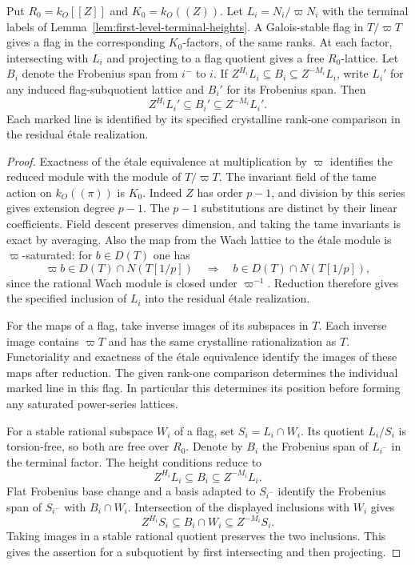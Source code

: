 \begin{lemma}
\label{lem:localized-induced-wach-heights}
Put \(R_0=k_O[[Z]]\) and \(K_0=k_O((Z))\). Let
\(L_i=N_i/\varpi N_i\) with the terminal labels of Lemma~\ref{lem:first-level-terminal-heights}. A Galois-stable flag in
\(T/\varpi T\) gives a flag in the corresponding \(K_0\)-factors,
of the same ranks. At each factor, intersecting with \(L_i\) and
projecting to a flag quotient gives a free \(R_0\)-lattice. Let \(B_i\) denote the Frobenius span from \(i^-\) to \(i\).
If \(Z^{H_i}L_i\subseteq B_i\subseteq Z^{-M_i}L_i\), write \(L_i'\) for any induced flag-subquotient lattice and \(B_i'\) for its Frobenius span. Then
\[
 Z^{H_i}L_i'\subseteq B_i'\subseteq Z^{-M_i}L_i'.
\] Each marked line is identified by its specified
crystalline rank-one comparison in the residual \'etale realization.
\end{lemma}

\begin{proof}
Exactness of the \'etale equivalence at multiplication by \(\varpi\)
identifies the reduced module with the module of \(T/\varpi T\).
The invariant field of the tame action on \(k_O((\pi))\) is \(K_0\).
Indeed \(Z\) has order \(p-1\), and division by this series gives
extension degree \(p-1\). The \(p-1\) substitutions are distinct by
their linear coefficients. Field descent preserves dimension, and
taking the tame invariants is exact by averaging. Also the map
from the Wach lattice to the \'etale module is \(\varpi\)-saturated:
for \(b\in D(T)\) one has
\[
 \varpi b\in D(T)\cap N(T[1/p])\quad\Longrightarrow\quad b\in D(T)\cap N(T[1/p]),
\]
since the rational Wach module is closed under \(\varpi^{-1}\). Reduction therefore gives the
specified inclusion of \(L_i\) into the residual \'etale realization.

For the maps of a flag, take inverse images of its subspaces in
\(T\). Each inverse image contains \(\varpi T\) and has the same
crystalline rationalization as \(T\). Functoriality and exactness
of the \'etale equivalence identify the images of these maps after
reduction. The given rank-one comparison determines the individual
marked line in this flag. In particular this determines its
position before forming any saturated power-series lattices.
\label{cor:cut-wach-models-2}

For a stable rational subspace \(W_i\) of a flag, set
\(S_i=L_i\cap W_i\). Its quotient \(L_i/S_i\) is torsion-free,
so both are free over \(R_0\). Denote by \(B_i\) the Frobenius
span of \(L_{i^-}\) in the terminal factor. The height conditions
reduce to
\[
    Z^{H_i} L_i\subseteq B_i\subseteq Z^{-M_i}L_i.
\]
Flat Frobenius base change and a basis adapted to \(S_{i^-}\)
identify the Frobenius span of \(S_{i^-}\) with \(B_i\cap W_i\).
Intersection of the displayed inclusions with \(W_i\) gives
\[
    Z^{H_i} S_i\subseteq B_i\cap W_i\subseteq Z^{-M_i}S_i.
\]
Taking images in a stable rational quotient preserves the two
inclusions. This gives the assertion for a subquotient by first
intersecting and then projecting.
\end{proof}

